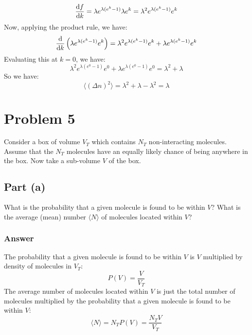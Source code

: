 \documentclass{article}
\begin{document}
\begin{equation}
    \dv{f}{k} = \lambda e^{\lambda (e^k - 1)} \lambda e^k = \lambda^2 e^{\lambda (e^k - 1)} e^k
\end{equation}
Now, applying the product rule, we have:
\begin{equation}
    \dv{k} \left( \lambda e^{\lambda (e^k - 1)} e^k \right) = \lambda^2 e^{\lambda (e^k - 1)} e^k + \lambda e^{\lambda (e^k - 1)} e^k
\end{equation}
Evaluating this at \( k = 0 \), we have:
\begin{equation}
    \lambda^2 e^{\lambda (e^0 - 1)} e^0 + \lambda e^{\lambda (e^0 - 1)} e^0 = \lambda^2 + \lambda
\end{equation}
So we have:
\begin{equation}
    \langle (\Delta n)^2 \rangle = \lambda^2 + \lambda - \lambda^2 = \boxed{\lambda}
\end{equation}


\section{Problem 5}
Consider a box of volume \( V_T \) which contains \( N_T \) non-interacting molecules. Assume that the \( N_T \) molecules have an equally likely chance of being anywhere in the box. Now take a sub-volume \( V \) of the box.

\subsection{Part (a)}
What is the probability that a given molecule is found to be within \( V \)? What is the average (mean) number \( \langle N \rangle \) of molecules located within \( V \)?
\subsubsection{Answer}
The probability that a given molecule is found to be within \( V \) is \( V \) multiplied by density of molecules in $V_T$:
\begin{equation}
\boxed{P(V) = \frac{V}{V_T}}
\end{equation}
The average number of molecules located within \( V \) is just the total number of molecules multiplied by the probability that a given molecule is found to be within \( V \):
\begin{equation}
    \langle N \rangle = N_T P(V) = \boxed{\frac{N_T V}{V_T}}
\end{equation}
\end{document}
